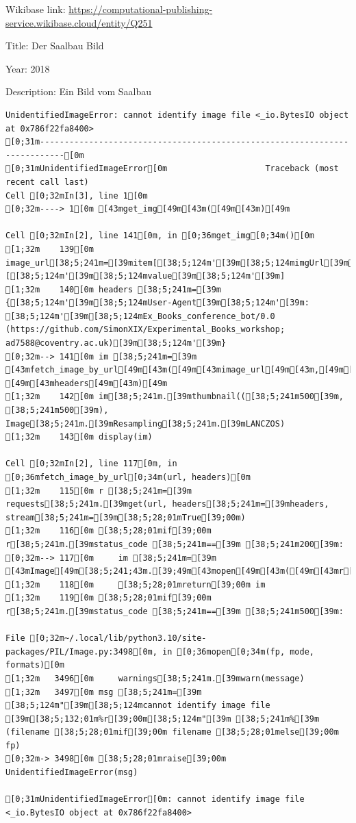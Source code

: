 \documentclass[
  letterpaper,
]{book}
\begin{document}
Wikibase link:
\url{https://computational-publishing-service.wikibase.cloud/entity/Q251}

Title: Der Saalbau Bild

Year: 2018

Description: Ein Bild vom Saalbau

\begin{verbatim}
UnidentifiedImageError: cannot identify image file <_io.BytesIO object at 0x786f22fa8400>
[0;31m---------------------------------------------------------------------------[0m
[0;31mUnidentifiedImageError[0m                    Traceback (most recent call last)
Cell [0;32mIn[3], line 1[0m
[0;32m----> 1[0m [43mget_img[49m[43m([49m[43m)[49m

Cell [0;32mIn[2], line 141[0m, in [0;36mget_img[0;34m()[0m
[1;32m    139[0m image_url[38;5;241m=[39mitem[[38;5;124m'[39m[38;5;124mimgUrl[39m[38;5;124m'[39m][[38;5;124m'[39m[38;5;124mvalue[39m[38;5;124m'[39m]
[1;32m    140[0m headers [38;5;241m=[39m {[38;5;124m'[39m[38;5;124mUser-Agent[39m[38;5;124m'[39m: [38;5;124m'[39m[38;5;124mEx_Books_conference_bot/0.0 (https://github.com/SimonXIX/Experimental_Books_workshop; ad7588@coventry.ac.uk)[39m[38;5;124m'[39m}
[0;32m--> 141[0m im [38;5;241m=[39m [43mfetch_image_by_url[49m[43m([49m[43mimage_url[49m[43m,[49m[43m [49m[43mheaders[49m[43m)[49m
[1;32m    142[0m im[38;5;241m.[39mthumbnail(([38;5;241m500[39m, [38;5;241m500[39m), Image[38;5;241m.[39mResampling[38;5;241m.[39mLANCZOS)
[1;32m    143[0m display(im)

Cell [0;32mIn[2], line 117[0m, in [0;36mfetch_image_by_url[0;34m(url, headers)[0m
[1;32m    115[0m r [38;5;241m=[39m requests[38;5;241m.[39mget(url, headers[38;5;241m=[39mheaders, stream[38;5;241m=[39m[38;5;28;01mTrue[39;00m)
[1;32m    116[0m [38;5;28;01mif[39;00m r[38;5;241m.[39mstatus_code [38;5;241m==[39m [38;5;241m200[39m:
[0;32m--> 117[0m     im [38;5;241m=[39m [43mImage[49m[38;5;241;43m.[39;49m[43mopen[49m[43m([49m[43mr[49m[38;5;241;43m.[39;49m[43mraw[49m[43m)[49m
[1;32m    118[0m     [38;5;28;01mreturn[39;00m im
[1;32m    119[0m [38;5;28;01mif[39;00m r[38;5;241m.[39mstatus_code [38;5;241m==[39m [38;5;241m500[39m:

File [0;32m~/.local/lib/python3.10/site-packages/PIL/Image.py:3498[0m, in [0;36mopen[0;34m(fp, mode, formats)[0m
[1;32m   3496[0m     warnings[38;5;241m.[39mwarn(message)
[1;32m   3497[0m msg [38;5;241m=[39m [38;5;124m"[39m[38;5;124mcannot identify image file [39m[38;5;132;01m%r[39;00m[38;5;124m"[39m [38;5;241m%[39m (filename [38;5;28;01mif[39;00m filename [38;5;28;01melse[39;00m fp)
[0;32m-> 3498[0m [38;5;28;01mraise[39;00m UnidentifiedImageError(msg)

[0;31mUnidentifiedImageError[0m: cannot identify image file <_io.BytesIO object at 0x786f22fa8400>
\end{verbatim}
\end{document}
